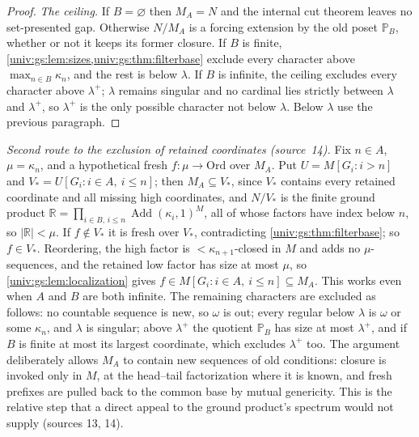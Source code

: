 \documentclass[11pt,letterpaper]{article}
\numberwithin{equation}{section}
\theoremstyle{definition}
\theoremstyle{remark}
\newcommand{\Ord}{\mathrm{Ord}}
\newcommand{\Add}{\operatorname{Add}}
\newcommand{\abs}[1]{\lvert#1\rvert}
\begin{document}
\begin{proof}
\emph{The ceiling.} If $B=\varnothing$ then $M_A=N$ and the internal cut theorem leaves no
set-presented gap. Otherwise $N/M_A$ is a forcing extension by the old poset $\mathbb P_B$,
whether or not it keeps its former closure. If $B$ is finite,
\cref{univ:gs:lem:sizes,univ:gs:thm:filterbase} exclude every character above
$\max_{n\in B}\kappa_n$, and the rest is below $\lambda$. If $B$ is infinite, the ceiling
excludes every character above $\lambda^+$; $\lambda$ remains singular and no cardinal lies
strictly between $\lambda$ and $\lambda^+$, so $\lambda^+$ is the only possible character
not below $\lambda$. Below $\lambda$ use the previous paragraph.
\end{proof}

\emph{Second route to the exclusion of retained coordinates (source~14).} Fix $n\in A$,
$\mu=\kappa_n$, and a hypothetical fresh $f:\mu\to\Ord$ over $M_A$. Put
$U=M[G_i:i>n]$ and $V_*=U[G_i:i\in A,\ i\le n]$; then $M_A\subseteq V_*$, since $V_*$
contains every retained coordinate and all missing high coordinates, and $N/V_*$ is the
finite ground product $\mathbb R=\prod_{i\in B,\,i\le n}\Add(\kappa_i,1)^M$, all of whose
factors have index below $n$, so $\abs{\mathbb R}<\mu$. If $f\notin V_*$ it is fresh over
$V_*$, contradicting \cref{univ:gs:thm:filterbase}; so $f\in V_*$. Reordering, the high
factor is $<\kappa_{n+1}$-closed in $M$ and adds no $\mu$-sequences, and the retained low
factor has size at most $\mu$, so \cref{univ:gs:lem:localization} gives
$f\in M[G_i:i\in A,\ i\le n]\subseteq M_A$. This works even when $A$ and $B$ are both
infinite. The remaining characters are excluded as follows: no countable sequence is new,
so $\omega$ is out; every regular below $\lambda$ is $\omega$ or some $\kappa_n$, and
$\lambda$ is singular; above $\lambda^+$ the quotient $\mathbb P_B$ has size at most
$\lambda^+$, and if $B$ is finite at most its largest coordinate, which excludes
$\lambda^+$ too. The argument deliberately allows $M_A$ to contain new sequences of old
conditions: closure is invoked only in $M$, at the head--tail factorization where it is
known, and fresh prefixes are pulled back to the common base by mutual genericity. This is
the relative step that a direct appeal to the ground product's spectrum would not supply
(sources 13, 14).
\end{document}
